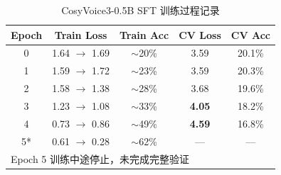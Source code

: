 \documentclass[12pt,a4paper]{article}
\begin{document}
\begin{table}[H]
\centering
\caption{CosyVoice3-0.5B SFT 训练过程记录}
\label{tab:sft-loss}
\begin{tabular}{ccccc}
\toprule
\textbf{Epoch} & \textbf{Train Loss} & \textbf{Train Acc} & \textbf{CV Loss} & \textbf{CV Acc} \\
\midrule
0 & 1.64 $\to$ 1.69 & $\sim$20\% & 3.59 & 20.1\% \\
1 & 1.59 $\to$ 1.72 & $\sim$23\% & 3.59 & 20.3\% \\
2 & 1.58 $\to$ 1.38 & $\sim$28\% & 3.68 & 19.6\% \\
\rowcolor{red!12} 3 & 1.23 $\to$ 1.08 & $\sim$33\% & \textbf{4.05} & 18.2\% \\
\rowcolor{red!8}  4 & 0.73 $\to$ 0.86 & $\sim$49\% & \textbf{4.59} & 16.8\% \\
5* & 0.61 $\to$ 0.28 & $\sim$62\% & --- & --- \\
\bottomrule
\multicolumn{5}{l}{\footnotesize *Epoch 5 训练中途停止，未完成完整验证} \\
\end{tabular}
\end{table}
\end{document}
